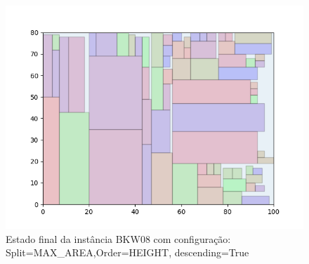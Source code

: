\begin{figure}[H]
    \centering
    \caption[]{Estado final da instância BKW08 com configuração: Split=MAX_AREA,Order=HEIGHT, descending=True}
    \label{fig:bkw08-max_area-height-true}
    \includegraphics[scale=0.5]{output/figures/bkw/bkw08/max_area/height/true/00}
\end{figure}